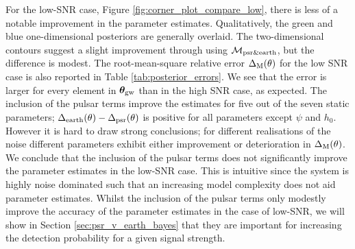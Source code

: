 \documentclass[fleqn,usenatbib,useAMS]{mnras}
\begin{document}
For the low-SNR case,  Figure \ref{fig:corner_plot_compare_low}, there is less of a notable improvement in the parameter estimates. Qualitatively, the green and blue one-dimensional posteriors are generally overlaid. The two-dimensional contours suggest a slight improvement through using $\mathcal{M}_{\rm psr \& earth}$, but the difference is modest. The root-mean-square relative error $\Delta_{\rm M}(\theta)$ for the low SNR case is also reported in Table \ref{tab:posterior_errors}. We see that the error is larger for every element in $\boldsymbol{\theta}_{\rm gw}$ than in the high SNR case, as expected. The inclusion of the pulsar terms improve the estimates for five out of the seven static parameters; $\Delta_{\rm earth}(\theta)-\Delta_{\rm psr}(\theta)$ is positive for all parameters except $\psi$ and $h_0$. However it is hard to draw strong conclusions; for different realisations of the noise different parameters exhibit either improvement or deterioration in $\Delta_{\rm M}(\theta)$. We conclude that the inclusion of the pulsar terms does not significantly improve the parameter estimates in the low-SNR case. This is intuitive since the system is highly noise dominated such that an increasing model complexity does not aid parameter estimates. Whilst the inclusion of the pulsar terms only modestly improve the accuracy of the parameter estimates in the case of low-SNR, we will show in Section \ref{sec:psr_v_earth_bayes} that they are important for increasing the detection probability for a given signal strength. \newline 
		
\end{document}
